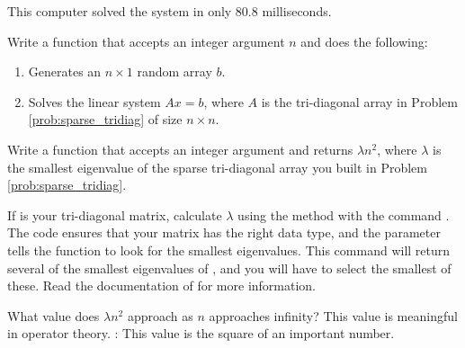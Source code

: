This computer solved the system in only 80.8 milliseconds.

\begin{problem}
Write a function that accepts an integer argument $n$ and does the following:
\begin{enumerate}
\item Generates an $n \times 1$ random array $b$.
\item Solves the linear system $Ax = b$, where $A$ is the tri-diagonal array in Problem \ref{prob:sparse_tridiag} of size $n \times n$.
\end{enumerate}
\end{problem}

\begin{problem}
Write a function that accepts an integer argument  and returns $\lambda n^2$, where
$\lambda$ is the smallest eigenvalue of the sparse tri-diagonal array you built in Problem \ref{prob:sparse_tridiag}.

If  is your tri-diagonal matrix, calculate $\lambda$ using the method  with the command .
The code  ensures that your matrix has the right data type, and the parameter  tells the function to look for the smallest eigenvalues.
This command will return several of the smallest eigenvalues of , and you will have to select the smallest of these.
Read the documentation of  for more information.

What value does $\lambda n^2$ approach as $n$ approaches infinity?
This value is meaningful in operator theory.
: This value is the square of an important number.

\end{problem}

